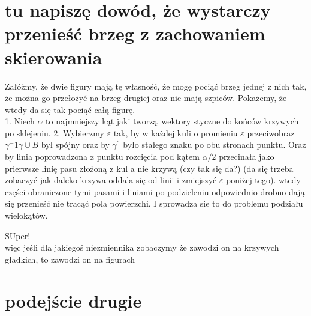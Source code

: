 \documentclass[a4paper, 12pt]{article}
\begin{document}
\section{tu napiszę dowód, że wystarczy przenieść brzeg z zachowaniem skierowania}

Załóżmy, że dwie figury mają tę własność, że mogę pociąć brzeg jednej z nich tak, że można go przełożyć na
brzeg drugiej oraz nie mają szpiców. Pokażemy, że wtedy da się tak pociąć całą figurę. \\
1. Niech $\alpha$ to najmniejszy kąt jaki tworzą wektory styczne do końców krzywych po sklejeniu.
2. Wybierzmy $\varepsilon$ tak, by w każdej kuli o promieniu $\varepsilon$ przeciwobraz $\gamma^-{1}\gamma
\cup B$ był spójny oraz by $\gamma^{''}$ było stałego znaku po obu stronach punktu. Oraz by linia
poprowadzona z punktu rozcięcia pod kątem $\alpha/2$ przecinała jako prierwsze linię pasu złożoną z kul a
nie krzywą (czy tak się da?) (da się trzeba zobaczyć jak daleko krzywa oddala się od linii i zmiejszyć
$\varepsilon$ poniżej tego). wtedy części obraniczone tymi pasami i liniami po podzieleniu odpowiednio
drobno dają się przenieść nie tracąć pola powierzchi. I sprowadza sie to do problemu podziału wielokątów.

SUper! \\
więc jeśli dla jakiegoś niezmiennika zobaczymy że zawodzi on na krzywych gładkich, to zawodzi on na
figurach \\

\section{podejście drugie}
\end{document}
